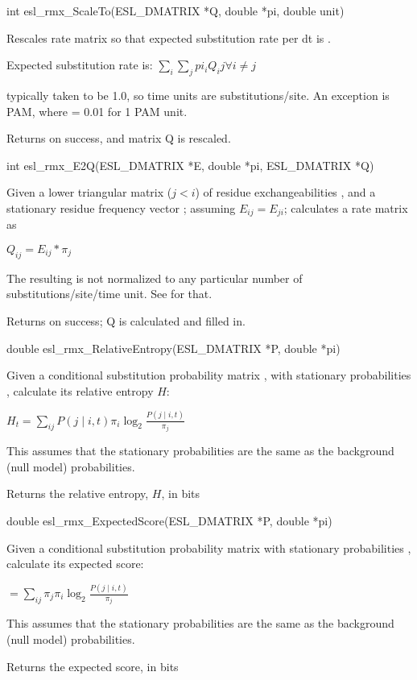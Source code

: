 \begin{sreapi}
\hypertarget{func:esl_rmx_ScaleTo()}
{\item[int esl\_rmx\_ScaleTo(ESL\_DMATRIX *Q, double *pi, double unit)]}

Rescales rate matrix  so that expected substitution
rate per dt is .

Expected substitution rate is:
$\sum_i \sum_j pi_i Q_ij  \forall i \neq j$

 typically taken to be 1.0, so time units are substitutions/site.
An exception is PAM, where  = 0.01 for 1 PAM unit.

Returns  on success, and matrix Q is rescaled.



\hypertarget{func:esl_rmx_E2Q()}
{\item[int esl\_rmx\_E2Q(ESL\_DMATRIX *E, double *pi, ESL\_DMATRIX *Q)]}

Given a lower triangular matrix ($j<i$) of 
residue exchangeabilities , and a stationary residue
frequency vector ; assuming $E_{ij} = E_{ji}$;
calculates a rate matrix  as

$Q_{ij} = E_{ij} * \pi_j$

The resulting  is not normalized to any particular
number of substitutions/site/time unit. See
 for that.

Returns  on success; Q is calculated and filled in.



\hypertarget{func:esl_rmx_RelativeEntropy()}
{\item[double esl\_rmx\_RelativeEntropy(ESL\_DMATRIX *P, double *pi)]}

Given a conditional substitution probability matrix ,
with stationary probabilities , calculate its
relative entropy $H$:

$H_t = \sum_{ij} P(j \mid i,t) \pi_i \log_2 \frac{P(j \mid i,t)} {\pi_j}$

This assumes that the stationary probabilities are the
same as the background (null model) probabilities.   

Returns the relative entropy, $H$, in bits


\hypertarget{func:esl_rmx_ExpectedScore()}
{\item[double esl\_rmx\_ExpectedScore(ESL\_DMATRIX *P, double *pi)]}

Given a conditional substitution probability matrix 
with stationary probabilities , calculate its
expected score:

$ = \sum_{ij} \pi_j \pi_i \log_2 \frac{P(j \mid i,t)} {\pi_j}$

This assumes that the stationary probabilities are the
same as the background (null model) probabilities.   

Returns the expected score, in bits


\end{sreapi}

